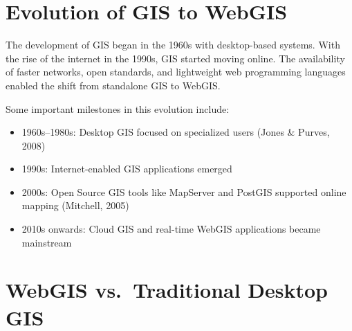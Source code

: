\documentclass[
  11pt,
  letterpaper,
]{book}
\providecommand{\tightlist}{%
  \setlength{\itemsep}{0pt}\setlength{\parskip}{0pt}}
\begin{document}
\section{Evolution of GIS to WebGIS}\label{evolution-of-gis-to-webgis}

The development of GIS began in the 1960s with desktop-based systems.
With the rise of the internet in the 1990s, GIS started moving online.
The availability of faster networks, open standards, and lightweight web
programming languages enabled the shift from standalone GIS to WebGIS.

Some important milestones in this evolution include:

\begin{itemize}
\tightlist
\item
  1960s--1980s: Desktop GIS focused on specialized users (Jones \&
  Purves, 2008)\\
\item
  1990s: Internet-enabled GIS applications emerged\\
\item
  2000s: Open Source GIS tools like MapServer and PostGIS supported
  online mapping (Mitchell, 2005)\\
\item
  2010s onwards: Cloud GIS and real-time WebGIS applications became
  mainstream
\end{itemize}

\section{WebGIS vs.~Traditional Desktop
GIS}\label{webgis-vs.-traditional-desktop-gis}
\end{document}
